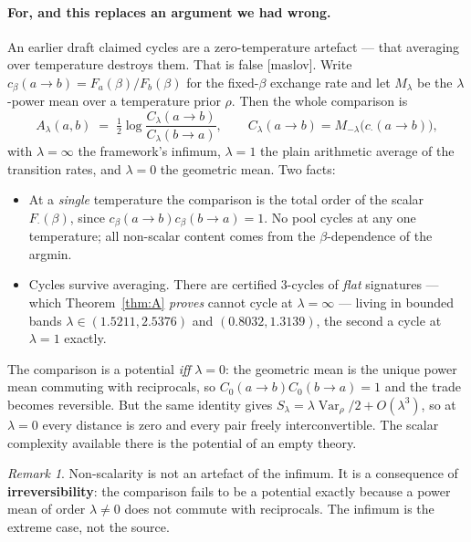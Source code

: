 \documentclass[11pt]{article}
\theoremstyle{plain}
\theoremstyle{remark}
\newtheorem{remark}[theorem]{Remark}
\newcommand{\ra}{\rightarrow}
\newcommand{\source}[1]{{\normalfont\small\textsf{[#1]}}}
\begin{document}
\paragraph{For, and this replaces an argument we had wrong.}
An earlier draft claimed cycles are a zero-temperature artefact --- that
averaging over temperature destroys them.  That is false \source{maslov}.  Write
$c_\beta(a\ra b) = F_a(\beta)/F_b(\beta)$ for the fixed-$\beta$ exchange rate and
let $M_\lambda$ be the $\lambda$-power mean over a temperature prior $\rho$.
Then the whole comparison is
\begin{equation}\label{eq:powermean}
  A_\lambda(a,b) \;=\; \tfrac12\log\frac{C_\lambda(a\ra b)}{C_\lambda(b\ra a)},
  \qquad C_\lambda(a\ra b) = M_{-\lambda}\bigl(c_{\cdot}(a\ra b)\bigr),
\end{equation}
with $\lambda = \infty$ the framework's infimum, $\lambda = 1$ the plain
arithmetic average of the transition rates, and $\lambda = 0$ the geometric
mean.  Two facts:
\begin{itemize}
\item At a \emph{single} temperature the comparison is the total order of the
  scalar $F_{\cdot}(\beta)$, since $c_\beta(a\ra b)c_\beta(b\ra a) = 1$.  No pool
  cycles at any one temperature; all non-scalar content comes from the
  $\beta$-dependence of the argmin.
\item Cycles survive averaging.  There are certified $3$-cycles of \emph{flat}
  signatures --- which Theorem~\ref{thm:A} \emph{proves} cannot cycle at
  $\lambda = \infty$ --- living in bounded bands
  $\lambda \in (1.5211, 2.5376)$ and $(0.8032, 1.3139)$, the second a cycle at
  $\lambda = 1$ exactly.
\end{itemize}
The comparison is a potential \emph{iff} $\lambda = 0$: the geometric mean is
the unique power mean commuting with reciprocals, so
$C_0(a\ra b)C_0(b\ra a) = 1$ and the trade becomes reversible.  But the same
identity gives $S_\lambda = \lambda\operatorname{Var}_\rho/2 + O(\lambda^3)$, so
at $\lambda = 0$ every distance is zero and every pair freely interconvertible.
The scalar complexity available there is the potential of an empty theory.

\begin{remark}
Non-scalarity is not an artefact of the infimum.  It is a consequence of
\textbf{irreversibility}: the comparison fails to be a potential exactly because
a power mean of order $\lambda \ne 0$ does not commute with reciprocals.  The
infimum is the extreme case, not the source.
\end{remark}
\end{document}
